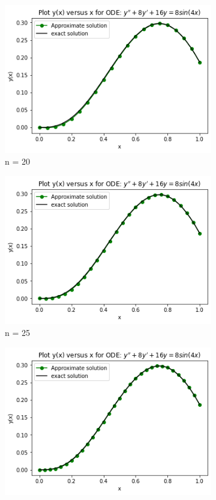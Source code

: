 \documentclass[a4paper,11.5 pt]{article}
\begin{document}
\begin{figure}[htb]
\medskip
\begin{subfigure}{0.25\textwidth}
  \includegraphics[width=\linewidth]{diagram/n = 20.png}
  \caption{n = 20}
  \label{fig:4}
\end{subfigure}\hfil %
\begin{subfigure}{0.25\textwidth}
  \includegraphics[width=\linewidth]{diagram/n = 25.png}
  \caption{n = 25}
  \label{fig:5}
\end{subfigure}\hfil %
\begin{subfigure}{0.25\textwidth}
  \includegraphics[width=\linewidth]{diagram/n = 30.png}

\end{subfigure}
\end{figure}
\end{document}
